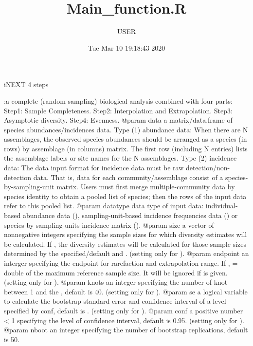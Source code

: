 \documentclass[]{article}
\title{Main\_function.R}
\author{USER}
\date{Tue Mar 10 19:18:43 2020}
\begin{document}
\maketitle

iNEXT 4 steps

:a complete (random sampling) biological analysis
combined with four parts:\cr
Step1: Sample Completeness.\cr
Step2: Interpolation and Extrapolation.\cr
Step3: Asymptotic diversity.\cr
Step4: Evenness.\cr
@param data a matrix/data.frame of species abundances/incidences
data.\cr
Type (1) abundance data: When there are N assemblages, the observed
species abundances should be arranged as a species (in rows) by
assemblage (in columns) matrix. The first row (including N entries)
lists the assemblage labels or site names for the N assemblages.\cr
Type (2) incidence data: The data input format for incidence data must
be raw detection/non-detection data. That is, data for each
community/assemblage consist of a species-by-sampling-unit matrix. Users
must first merge multiple-community data by species identity to obtain a
pooled list of species; then the rows of the input data refer to this
pooled list. \cr
@param datatype data type of input data: individual-based abundance data
(), sampling-unit-based incidence
frequencies data () or species by
sampling-units incidence matrix ().\cr
@param size a vector of nonnegative integers specifying the sample sizes
for which diversity estimates will be calculated. If , the
diversity estimates will be calculated for those sample sizes determined
by the specified/default  and . \cr
(setting only for ).\cr
@param endpoint an interger specifying the endpoint for rarefaction and
extrapolation range. If ,  = double of the
maximum reference sample size. It will be ignored if  is
given. \cr
(setting only for ).\cr
@param knots an integer specifying the number of knot between 1 and the
, default is 40.\cr
(setting only for ).\cr
@param se a logical variable to calculate the bootstrap standard error
and confidence interval of a level specified by conf, default is
.\cr
(setting only for ).\cr
@param conf a positive number \textless{} 1 specifying the level of
confidence interval, default is 0.95.\cr
(setting only for ).\cr
@param nboot an integer specifying the number of bootstrap replications,
default is 50.\cr
\end{document}
